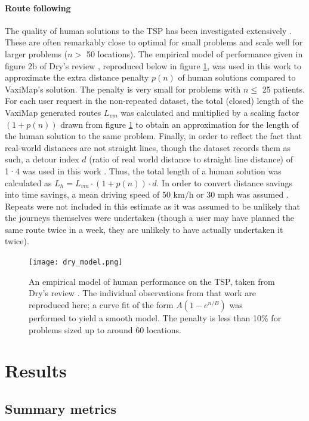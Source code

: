\documentclass[review]{elsarticle}
\def\vm{VaxiMap}
\begin{document}
\paragraph{Route following}
The quality of human solutions to the TSP has been investigated extensively \cite{Vickers2001, MacGregor1999a, MacGregor2011, Macgregor1996}. These are often remarkably close to optimal for small problems and scale well  for larger problems ($n > $ 50 locations). The empirical model of performance given in figure 2b of Dry's review \cite{Dry2006}, reproduced below in figure \ref{dry_model}, was used in this work to approximate the extra distance penalty $p(n)$ of human solutions compared to \vm{}'s solution. The penalty is very small for problems with $n \leq$ 25 patients. For each user request in the non-repeated dataset, the total (closed) length of the \vm{} generated routes $L_{vm}$ was calculated and multiplied by a scaling factor $(1 + p(n))$ drawn from figure \ref{dry_model} to obtain an approximation for the length of the human solution to the same problem. Finally, in order to reflect the fact that real-world distances are not straight lines, though the dataset records them as such, a detour index $d$ (ratio of real world distance to straight line distance) of 1·4 was used in this work \cite{Cole1968}. Thus, the total length of a human solution was calculated as $L_{h} = L_{vm} \cdot (1 + p(n)) \cdot d$. In order to convert distance savings into time savings, a mean driving speed of 50 km/h or 30 mph was assumed \cite{Balendra2020}. Repeats were not included in this estimate as it was assumed to be unlikely that the journeys themselves were undertaken (though a user may have planned the same route twice in a week, they are unlikely to have actually undertaken it twice).  

\begin{figure}[H]
\centering
\texttt{[image: dry\_model.png]}
\caption{An empirical model of human performance on the TSP, taken from Dry's review \cite{Dry2006}. The individual observations from that work are reproduced here; a curve fit of the form $A(1 - e^{n/B})$ was performed to yield a smooth model. The penalty is less than 10\% for problems sized up to around 60 locations.}
\label{dry_model}
\end{figure}

\section{Results}

\subsection{Summary metrics}
\end{document}

